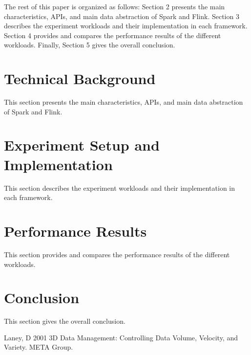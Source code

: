 \documentclass[]{article}
\begin{document}
\par The rest of this paper is organized as follows: Section 2
presents the main characteristics, APIs, and main data abstraction of Spark and Flink. Section 3  describes the experiment workloads and their implementation in each framework. Section 4
provides and compares the performance results of the different workloads. Finally, Section 5 gives the overall conclusion.

\section{Technical Background}
This section presents the main characteristics, APIs, and main data abstraction of Spark and Flink.

\section{Experiment Setup and Implementation}
This section describes the experiment workloads and their implementation in each framework.
\section{Performance Results}

This section provides and compares the performance results of the different workloads.

\section{Conclusion}
This section gives the overall conclusion.


\begin{thebibliography}{[MT1]}
%
Laney, D 2001 3D Data Management: Controlling Data Volume, Velocity, and Variety. META Group.

%
\end{thebibliography}
\end{document}
